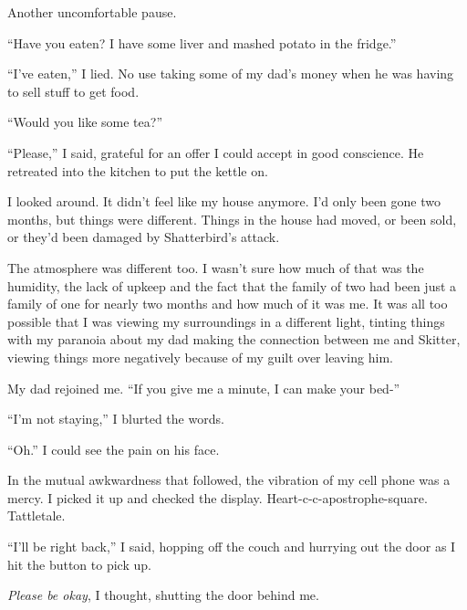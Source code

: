 Another uncomfortable pause.



``Have you eaten?  I have some liver and mashed potato in the fridge.''



``I've eaten,'' I lied.  No use taking some of my dad's money when he was having to sell stuff to get food.



``Would you like some tea?''



``Please,'' I said, grateful for an offer I could accept in good conscience.  He retreated into the kitchen to put the kettle on.



I looked around.  It didn't feel like my house anymore.  I'd only been gone two months, but things were different.  Things in the house had moved, or been sold, or they'd been damaged by Shatterbird's attack.



The atmosphere was different too.  I wasn't sure how much of that was the humidity, the lack of upkeep and the fact that the family of two had been just a family of one for nearly two months and how much of it was me.  It was all too possible that I was viewing my surroundings in a different light, tinting things with my paranoia about my dad making the connection between me and Skitter, viewing things more negatively because of my guilt over leaving him.



My dad rejoined me.  ``If you give me a minute, I can make your bed-''



``I'm not staying,'' I blurted the words.



``Oh.''  I could see the pain on his face.



In the mutual awkwardness that followed, the vibration of my cell phone was a mercy.  I picked it up and checked the display.  Heart-c-c-apostrophe-square.  Tattletale.



``I'll be right back,'' I said, hopping off the couch and hurrying out the door as I hit the button to pick up.



\emph{Please be okay}, I thought, shutting the door behind me.



